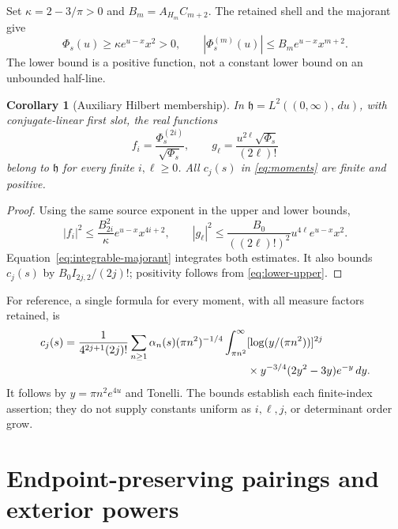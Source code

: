 \documentclass[11pt,letterpaper]{article}
\numberwithin{equation}{section}
\newtheorem{corollary}[theorem]{Corollary}
\theoremstyle{remark}
\newcommand{\dd}{\,d}
\newcommand{\hs}{\mathfrak h}
\begin{document}
Set \(\kappa=2-3/\pi>0\) and \(B_m=A_{H_m}C_{m+2}\).
The retained shell and the majorant give
\begin{equation}
 \Phi_s(u)\ge\kappa e^{u-x}x^2>0,\qquad
 |\Phi_s^{(m)}(u)|\le B_m e^{u-x}x^{m+2}.
 \label{eq:lower-upper}
\end{equation}
The lower bound is a positive function, not a constant lower bound
on an unbounded half-line.

\begin{corollary}[Auxiliary Hilbert membership]\label{cor:membership}
In \(\hs=L^2((0,\infty),\dd u)\), with conjugate-linear first slot,
the real functions
\begin{equation}
 f_i=\frac{\Phi_s^{(2i)}}{\sqrt{\Phi_s}},\qquad
 g_\ell=\frac{u^{2\ell}\sqrt{\Phi_s}}{(2\ell)!}
 \label{eq:auxiliary-functions}
\end{equation}
belong to \(\hs\) for every finite \(i,\ell\ge0\).
All \(c_j(s)\) in \eqref{eq:moments} are finite and positive.
\end{corollary}
\begin{proof}
Using the same source exponent in the upper and lower bounds,
\[
 |f_i|^2\le\frac{B_{2i}^2}{\kappa}e^{u-x}x^{4i+2},\qquad
 |g_\ell|^2\le\frac{B_0}{((2\ell)!)^2}
                  u^{4\ell}e^{u-x}x^2.
\]
Equation~\eqref{eq:integrable-majorant} integrates both estimates.
It also bounds \(c_j(s)\) by \(B_0I_{2j,2}/(2j)!\);
positivity follows from \eqref{eq:lower-upper}.
\end{proof}

For reference, a single formula for every moment, with all measure
factors retained, is
\begin{align}
 c_j(s)=\frac1{4^{2j+1}(2j)!}
 \sum_{n\ge1}\alpha_n(s)(\pi n^2)^{-1/4}
 \int_{\pi n^2}^\infty
 &[\log(y/(\pi n^2))]^{2j}\notag\\[-2pt]
 &{}\times y^{-3/4}(2y^2-3y)e^{-y}\dd y.
 \label{eq:moment-formula}
\end{align}
It follows by \(y=\pi n^2e^{4u}\) and Tonelli.
The bounds establish each finite-index assertion; they do not
supply constants uniform as \(i,\ell,j\), or determinant order grow.

\section{Endpoint-preserving pairings and exterior powers}
\label{sec:pairing}
\end{document}
